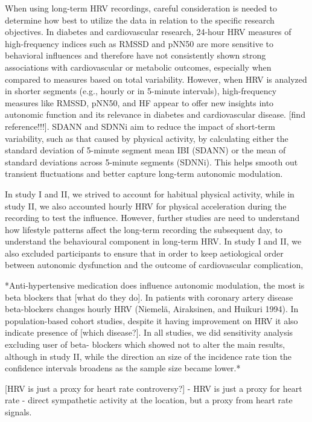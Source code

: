 \documentclass[
  a4paper,
  headsepline=true,
  open=any]{scrbook}
\begin{document}
When using long-term HRV recordings, careful consideration is needed to
determine how best to utilize the data in relation to the specific
research objectives. In diabetes and cardiovascular research, 24-hour
HRV measures of high-frequency indices such as RMSSD and pNN50 are more
sensitive to behavioral influences and therefore have not consistently
shown strong associations with cardiovascular or metabolic outcomes,
especially when compared to measures based on total variability.
However, when HRV is analyzed in shorter segments (e.g., hourly or in
5-minute intervals), high-frequency measures like RMSSD, pNN50, and HF
appear to offer new insights into autonomic function and its relevance
in diabetes and cardiovascular disease. {[}find reference!!!{]}. SDANN
and SDNNi aim to reduce the impact of short-term variability, such as
that caused by physical activity, by calculating either the standard
deviation of 5-minute segment mean IBI (SDANN) or the mean of standard
deviations across 5-minute segments (SDNNi). This helps smooth out
transient fluctuations and better capture long-term autonomic
modulation.

In study I and II, we strived to account for habitual physical activity,
while in study II, we also accounted hourly HRV for physical
acceleration during the recording to test the influence. However,
further studies are need to understand how lifestyle patterns affect the
long-term recording the subsequent day, to understand the behavioural
component in long-term HRV. In study I and II, we also excluded
participants to ensure that in order to keep aetiological order between
autonomic dysfunction and the outcome of cardiovascular complication,

*Anti-hypertensive medication does influence autonomic modulation, the
most is beta blockers that {[}what do they do{]}. In patients with
coronary artery disease beta-blockers changes hourly HRV (Niemelä,
Airaksinen, and Huikuri 1994). In population-based cohort studies,
despite it having improvement on HRV it also indicate presence of
{[}which disease?{]}. In all studies, we did sensitivity analysis
excluding user of beta- blockers which showed not to alter the main
results, although in study II, while the direction an size of the
incidence rate tion the confidence intervals broadens as the sample size
became lower.*

{[}HRV is just a proxy for heart rate controversy?{]} - HRV is just a
proxy for heart rate - direct sympathetic activity at the location, but
a proxy from heart rate signals.
\end{document}

